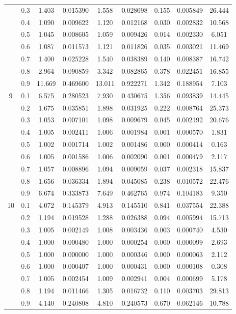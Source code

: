 \begin{longtable}{ | c | c || c | c | c | c | c | c | c | }
 & 0.3 & 1.403 & 0.015390 & 1.558 & 0.028098 & 0.155 & 0.005849 & 26.444 \\
 & 0.4 & 1.090 & 0.009622 & 1.120 & 0.012168 & 0.030 & 0.002832 & 10.568 \\
 & 0.5 & 1.045 & 0.008605 & 1.059 & 0.009426 & 0.014 & 0.002330 & 6.051 \\
 & 0.6 & 1.087 & 0.011573 & 1.121 & 0.011826 & 0.035 & 0.003021 & 11.469 \\
 & 0.7 & 1.400 & 0.025228 & 1.540 & 0.038389 & 0.140 & 0.008387 & 16.742 \\
 & 0.8 & 2.964 & 0.090859 & 3.342 & 0.082865 & 0.378 & 0.022451 & 16.855 \\
 & 0.9 & 11.669 & 0.469600 & 13.011 & 0.922271 & 1.342 & 0.188954 & 7.103 \\
 \hline
\multirow{9}{*}{9} & 0.1 & 6.575 & 0.280523 & 7.930 & 0.430675 & 1.356 & 0.093839 & 14.445 \\
 & 0.2 & 1.675 & 0.035851 & 1.898 & 0.031925 & 0.222 & 0.008764 & 25.373 \\
 & 0.3 & 1.053 & 0.007101 & 1.098 & 0.009679 & 0.045 & 0.002192 & 20.676 \\
 & 0.4 & 1.005 & 0.002411 & 1.006 & 0.001984 & 0.001 & 0.000570 & 1.831 \\
 & 0.5 & 1.002 & 0.001714 & 1.002 & 0.001486 & 0.000 & 0.000414 & 0.163 \\
 & 0.6 & 1.005 & 0.001586 & 1.006 & 0.002090 & 0.001 & 0.000479 & 2.117 \\
 & 0.7 & 1.057 & 0.008896 & 1.094 & 0.009059 & 0.037 & 0.002318 & 15.837 \\
 & 0.8 & 1.656 & 0.036334 & 1.894 & 0.045085 & 0.238 & 0.010572 & 22.476 \\
 & 0.9 & 6.674 & 0.333873 & 7.649 & 0.462765 & 0.974 & 0.104183 & 9.350 \\
 \hline
\multirow{9}{*}{10} & 0.1 & 4.072 & 0.145379 & 4.913 & 0.145510 & 0.841 & 0.037554 & 22.388 \\
 & 0.2 & 1.194 & 0.019528 & 1.288 & 0.026388 & 0.094 & 0.005994 & 15.713 \\
 & 0.3 & 1.005 & 0.002149 & 1.008 & 0.003436 & 0.003 & 0.000740 & 4.530 \\
 & 0.4 & 1.000 & 0.000480 & 1.000 & 0.000254 & 0.000 & 0.000099 & 2.693 \\
 & 0.5 & 1.000 & 0.000000 & 1.000 & 0.000346 & 0.000 & 0.000063 & 2.112 \\
 & 0.6 & 1.000 & 0.000407 & 1.000 & 0.000431 & 0.000 & 0.000108 & 0.308 \\
 & 0.7 & 1.005 & 0.002454 & 1.009 & 0.002941 & 0.004 & 0.000699 & 5.178 \\
 & 0.8 & 1.194 & 0.011466 & 1.305 & 0.016732 & 0.110 & 0.003703 & 29.813 \\
 & 0.9 & 4.140 & 0.240808 & 4.810 & 0.240573 & 0.670 & 0.062146 & 10.788 \\
 \hline
\hline
\end{longtable}
 
